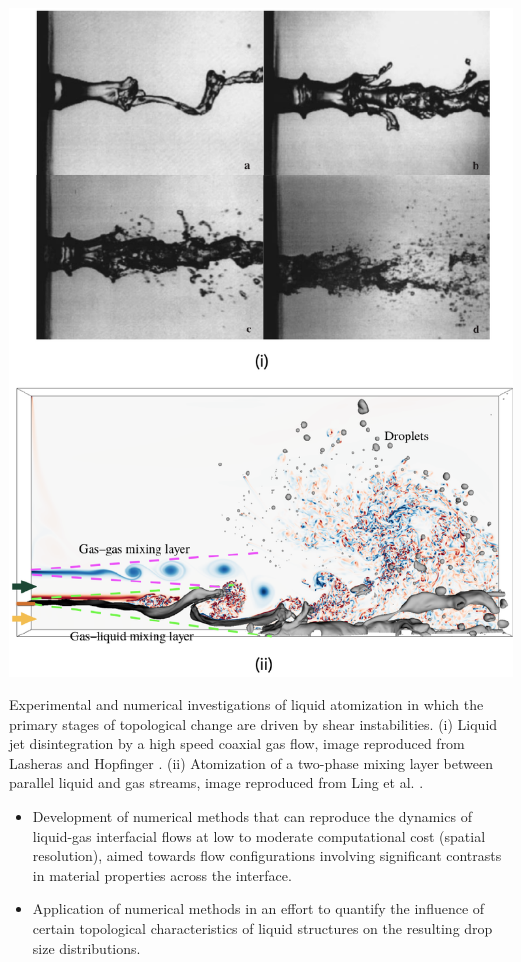 \begin{marginfigure}
\centering
\includegraphics{plots/intro/shear.pdf}
	\caption{ Experimental and numerical investigations of liquid atomization 
	in which the primary stages of topological change are driven by shear instabilities. 
	(i) Liquid jet disintegration by a high speed coaxial gas flow, image reproduced from Lasheras and Hopfinger \cite{lasheras}.
	(ii) Atomization of a two-phase mixing layer between parallel liquid and gas streams, image 
	reproduced from Ling et al. \cite{ling}.
	}
\label{shear}
\end{marginfigure}

\begin{itemize}
	\item Development of numerical methods that can reproduce the dynamics of liquid-gas interfacial flows
		at low to moderate computational cost (spatial resolution), aimed towards flow configurations 
		involving significant contrasts in material properties across the interface. 
	\item Application of numerical methods in an effort to quantify the influence of certain topological
		characteristics of liquid structures on the resulting drop size distributions.  
\end{itemize}

